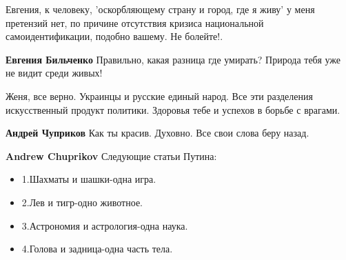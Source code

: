 \begin{itemize}
\begin{itemize}
 
Евгения, к человеку, 'оскорбляющему страну и город, где я живу' у меня претензий нет, по причине отсутствия кризиса национальной самоидентификации, подобно вашему. Не болейте!.

 
\textbf{Евгения Бильченко} Правильно, какая разница где умирать? Природа тебя уже не видит среди живых!

\end{itemize}

 

Женя, все верно. Украинцы и русские единый народ. Все эти разделения
искусственный продукт политики. Здоровья тебе и успехов в борьбе с врагами.

\begin{itemize}
 
\textbf{Андрей Чуприков} Как ты красив. Духовно. Все свои слова беру назад.

 
\textbf{Andrew Chuprikov}
Следующие статьи Путина:

\begin{itemize}
  \item 1.Шахматы и шашки-одна игра.
  \item 2.Лев и тигр-одно животное.
  \item 3.Астрономия и астрология-одна наука.
  \item 4.Голова и задница-одна часть тела.
\end{itemize}



\end{itemize}
\end{itemize}
